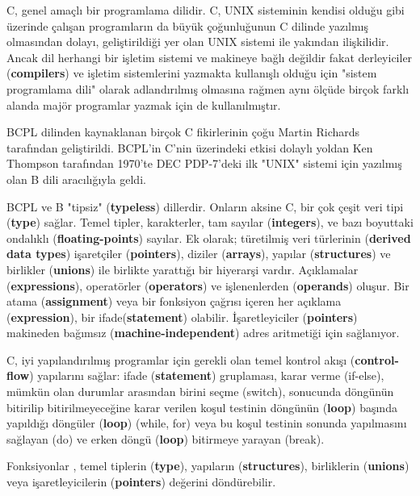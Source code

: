 \documentclass[a4paper,12pt,oneside]{book}
\begin{document}
C, genel amaçlı bir programlama dilidir. C, UNIX sisteminin kendisi olduğu gibi üzerinde çalışan programların da büyük çoğunluğunun C dilinde yazılmış olmasından dolayı, geliştirildiği yer olan UNIX sistemi ile yakından ilişkilidir. Ancak dil herhangi bir işletim sistemi ve makineye bağlı değildir fakat derleyiciler (\textbf{compilers}) ve işletim sistemlerini yazmakta kullanışlı olduğu için "sistem programlama dili" olarak adlandırılmış olmasına rağmen aynı ölçüde birçok farklı alanda majör programlar yazmak için de kullanılmıştır.
\par BCPL dilinden kaynaklanan birçok C fikirlerinin çoğu Martin Richards tarafından geliştirildi. BCPL'in C'nin üzerindeki etkisi dolaylı yoldan Ken Thompson tarafından 1970'te DEC PDP-7'deki ilk "UNIX" sistemi için yazılmış olan B dili aracılığıyla geldi.
\par BCPL ve B "tipsiz" (\textbf{typeless}) dillerdir. Onların aksine C, bir çok çeşit veri tipi (\textbf{type}) sağlar. Temel tipler, karakterler, tam sayılar (\textbf{integers}), ve bazı boyuttaki ondalıklı (\textbf{floating-points}) sayılar. Ek olarak; türetilmiş veri türlerinin (\textbf{derived data types}) işaretçiler (\textbf{pointers}), diziler (\textbf{arrays}), yapılar (\textbf{structures}) ve birlikler (\textbf{unions}) ile birlikte yarattığı bir hiyerarşi vardır. Açıklamalar (\textbf{expressions}), operatörler (\textbf{operators}) ve işlenenlerden (\textbf{operands}) oluşur. Bir atama (\textbf{assignment}) veya bir fonksiyon  çağrısı içeren her açıklama (\textbf{expression}), bir ifade(\textbf{statement}) olabilir. İşaretleyiciler (\textbf{pointers}) makineden bağımsız (\textbf{machine-independent}) adres aritmetiği için sağlanıyor.
\par C, iyi yapılandırılmış programlar için gerekli olan temel kontrol akışı (\textbf{control-flow}) yapılarını sağlar: ifade (\textbf{statement}) gruplaması, karar verme (if-else), mümkün olan durumlar arasından birini seçme (switch), sonucunda döngünün bitirilip bitirilmeyeceğine karar verilen koşul testinin döngünün (\textbf{loop}) başında yapıldığı döngüler (\textbf{loop}) (while, for) veya bu koşul testinin sonunda yapılmasını sağlayan (do) ve erken döngü (\textbf{loop}) bitirmeye yarayan (break).
\par Fonksiyonlar , temel tiplerin (\textbf{type}), yapıların (\textbf{structures}), birliklerin (\textbf{unions}) veya işaretleyicilerin (\textbf{pointers}) değerini döndürebilir. \pagebreak
\end{document}
